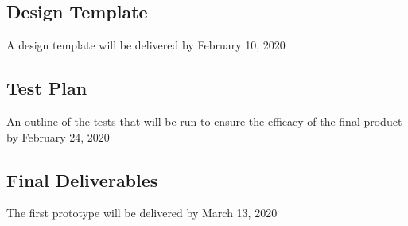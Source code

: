 \documentclass{article}
\begin{document}
\subsection{Design Template}
A design template will be delivered by February 10, 2020

\subsection{Test Plan}
An outline of the tests that will be run to ensure the efficacy of the final product by February 24, 2020

\subsection{Final Deliverables}
The first prototype will be delivered by March 13, 2020
\end{document}
